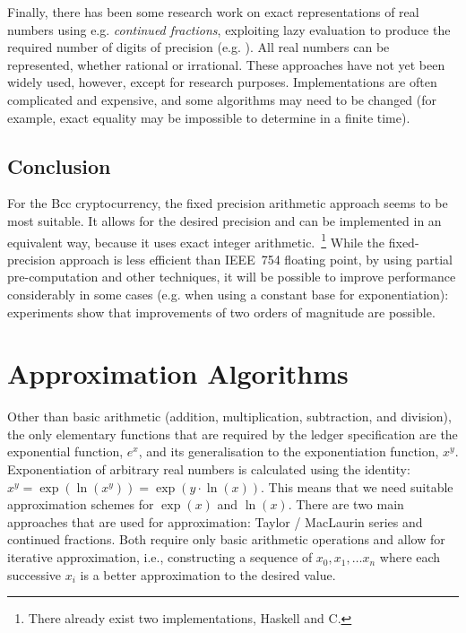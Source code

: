\documentclass[11pt,a4paper,dvipsnames,twosided]{article}
\theoremstyle{definition}
\theoremstyle{definition}
\begin{document}
Finally, there has been some research work on exact representations of real
numbers using e.g. \emph{continued fractions}, exploiting lazy evaluation to
produce the required number of digits of precision
(e.g. \cite{DBLP:journals/tcs/Escardo96}).  All real numbers can be represented,
whether rational or irrational.  These approaches have not yet been widely used,
however, except for research purposes.  Implementations are often complicated
and expensive, and some algorithms may need to be changed (for example, exact
equality may be impossible to determine in a finite time).

\subsection{Conclusion}
\label{sec:summary}

For the Bcc cryptocurrency, the fixed precision arithmetic approach
seems to be most suitable. It allows for the desired precision and can be
implemented in an equivalent way, because it uses exact integer
arithmetic.~\footnote{There already exist two implementations, Haskell and C.}
While the fixed-precision approach is less efficient than IEEE~754 floating point,
by using partial pre-computation and other techniques, it will be possible to improve performance considerably in
some cases (e.g. when using a constant base for exponentiation): experiments show that improvements
of two orders of magnitude are possible.

\section{Approximation Algorithms}
\label{sec:algorithms}

Other than basic arithmetic (addition, multiplication, subtraction, and
division), the only elementary functions that are required by the ledger
specification are the exponential function, $e^{x}$, and its generalisation to
the exponentiation function, $x^{y}$. Exponentiation of arbitrary real numbers
is calculated using the identity:
$x^{y}= \exp({\ln(x^{y})}) = \exp(y\cdot \ln(x))$. This means that we need
suitable approximation schemes for $\exp(x)$ and $\ln(x)$.
%
There are two main approaches that are used for approximation: Taylor / MacLaurin series and
continued fractions. Both require only basic arithmetic operations and allow for
iterative approximation, i.e., constructing a sequence of $x_{0},x_{1},\ldots
x_{n}$ where each successive $x_{i}$ is a better
approximation to the desired value.
\end{document}
